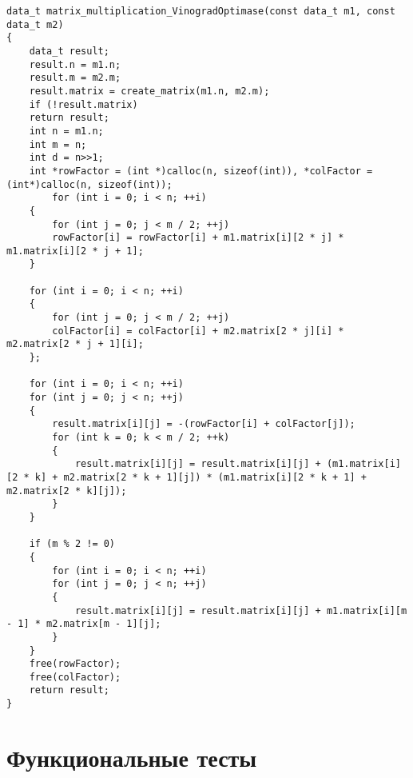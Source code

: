 \newpage
\begin{center}
\begin{lstlisting}[label=vino_o,caption = {Оптимизированный алгоритм Винограда умножения матриц}]
data_t matrix_multiplication_VinogradOptimase(const data_t m1, const data_t m2)
{
	data_t result;
	result.n = m1.n;
	result.m = m2.m;
	result.matrix = create_matrix(m1.n, m2.m);
	if (!result.matrix)
	return result;
	int n = m1.n;
	int m = n;
	int d = n>>1;
	int *rowFactor = (int *)calloc(n, sizeof(int)), *colFactor = (int*)calloc(n, sizeof(int));
		for (int i = 0; i < n; ++i)
	{
		for (int j = 0; j < m / 2; ++j)
		rowFactor[i] = rowFactor[i] + m1.matrix[i][2 * j] * m1.matrix[i][2 * j + 1];
	}
	
	for (int i = 0; i < n; ++i)
	{
		for (int j = 0; j < m / 2; ++j)
		colFactor[i] = colFactor[i] + m2.matrix[2 * j][i] * m2.matrix[2 * j + 1][i];
	};
	
	for (int i = 0; i < n; ++i)
	for (int j = 0; j < n; ++j)
	{
		result.matrix[i][j] = -(rowFactor[i] + colFactor[j]);
		for (int k = 0; k < m / 2; ++k)
		{
			result.matrix[i][j] = result.matrix[i][j] + (m1.matrix[i][2 * k] + m2.matrix[2 * k + 1][j]) * (m1.matrix[i][2 * k + 1] + m2.matrix[2 * k][j]);
		}
	}
	
	if (m % 2 != 0)
	{
		for (int i = 0; i < n; ++i)
		for (int j = 0; j < n; ++j)
		{
			result.matrix[i][j] = result.matrix[i][j] + m1.matrix[i][m - 1] * m2.matrix[m - 1][j];
		}
	}
	free(rowFactor);
	free(colFactor);
	return result;
}
\end{lstlisting}

\end{center}
\newpage
\section{Функциональные тесты}

